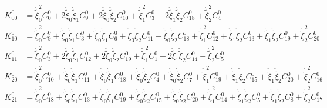 \begin{equation}\begin{aligned}
K^0_{00} &= \mathring{\widetilde{\xi}}_0^{2} {C^{0}_{0}} + 2 \mathring{\widetilde{\xi}}_0 \mathring{\widetilde{\xi}}_1 {C^{0}_{9}} + 2 \mathring{\widetilde{\xi}}_0 \mathring{\widetilde{\xi}}_2 {C^{0}_{10}} + \mathring{\widetilde{\xi}}_1^{2} {C^{0}_{3}} + 2 \mathring{\widetilde{\xi}}_1 \mathring{\widetilde{\xi}}_2 {C^{0}_{18}} + \mathring{\widetilde{\xi}}_2^{2} {C^{0}_{4}}\\
K^0_{10} &= \mathring{\widetilde{\xi}}_0^{2} {C^{0}_{9}} + \mathring{\widetilde{\xi}}_0 \mathring{\widetilde{\xi}}_1 {C^{0}_{3}} + \mathring{\widetilde{\xi}}_0 \mathring{\widetilde{\xi}}_1 {C^{0}_{6}} + \mathring{\widetilde{\xi}}_0 \mathring{\widetilde{\xi}}_2 {C^{0}_{11}} + \mathring{\widetilde{\xi}}_0 \mathring{\widetilde{\xi}}_2 {C^{0}_{18}} + \mathring{\widetilde{\xi}}_1^{2} {C^{0}_{12}} + \mathring{\widetilde{\xi}}_1 \mathring{\widetilde{\xi}}_2 {C^{0}_{13}} + \mathring{\widetilde{\xi}}_1 \mathring{\widetilde{\xi}}_2 {C^{0}_{19}} + \mathring{\widetilde{\xi}}_2^{2} {C^{0}_{20}}\\
K^0_{11} &= \mathring{\widetilde{\xi}}_0^{2} {C^{0}_{3}} + 2 \mathring{\widetilde{\xi}}_0 \mathring{\widetilde{\xi}}_1 {C^{0}_{12}} + 2 \mathring{\widetilde{\xi}}_0 \mathring{\widetilde{\xi}}_2 {C^{0}_{19}} + \mathring{\widetilde{\xi}}_1^{2} {C^{0}_{1}} + 2 \mathring{\widetilde{\xi}}_1 \mathring{\widetilde{\xi}}_2 {C^{0}_{14}} + \mathring{\widetilde{\xi}}_2^{2} {C^{0}_{5}}\\
K^0_{20} &= \mathring{\widetilde{\xi}}_0^{2} {C^{0}_{10}} + \mathring{\widetilde{\xi}}_0 \mathring{\widetilde{\xi}}_1 {C^{0}_{11}} + \mathring{\widetilde{\xi}}_0 \mathring{\widetilde{\xi}}_1 {C^{0}_{18}} + \mathring{\widetilde{\xi}}_0 \mathring{\widetilde{\xi}}_2 {C^{0}_{4}} + \mathring{\widetilde{\xi}}_0 \mathring{\widetilde{\xi}}_2 {C^{0}_{7}} + \mathring{\widetilde{\xi}}_1^{2} {C^{0}_{19}} + \mathring{\widetilde{\xi}}_1 \mathring{\widetilde{\xi}}_2 {C^{0}_{15}} + \mathring{\widetilde{\xi}}_1 \mathring{\widetilde{\xi}}_2 {C^{0}_{20}} + \mathring{\widetilde{\xi}}_2^{2} {C^{0}_{16}}\\
K^0_{21} &= \mathring{\widetilde{\xi}}_0^{2} {C^{0}_{18}} + \mathring{\widetilde{\xi}}_0 \mathring{\widetilde{\xi}}_1 {C^{0}_{13}} + \mathring{\widetilde{\xi}}_0 \mathring{\widetilde{\xi}}_1 {C^{0}_{19}} + \mathring{\widetilde{\xi}}_0 \mathring{\widetilde{\xi}}_2 {C^{0}_{15}} + \mathring{\widetilde{\xi}}_0 \mathring{\widetilde{\xi}}_2 {C^{0}_{20}} + \mathring{\widetilde{\xi}}_1^{2} {C^{0}_{14}} + \mathring{\widetilde{\xi}}_1 \mathring{\widetilde{\xi}}_2 {C^{0}_{5}} + \mathring{\widetilde{\xi}}_1 \mathring{\widetilde{\xi}}_2 {C^{0}_{8}} + \mathring{\widetilde{\xi}}_2^{2} {C^{0}_{17}}\\

\end{aligned}
\end{equation}
